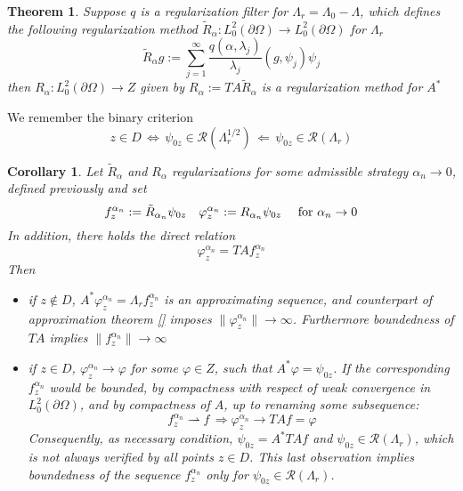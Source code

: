 \documentclass[10pt, a4paper, twoside, openright]{book}
\theoremstyle{definition}
\theoremstyle{plain}
\newtheorem{theorem}[subsection]{Theorem}
\theoremstyle{plain}
\newtheorem{corollary}[subsection]{Corollary}
\theoremstyle{plain}
\theoremstyle{plain}
\theoremstyle{plain}
\theoremstyle{plain}
\theoremstyle{plain}
\theoremstyle{plain}
\let\phi\varphi
\begin{document}
\begin{theorem}
 Suppose $q$ is a regularization filter for $\Lambda_r = \Lambda_0- \Lambda$, which defines the following regularization method $\tilde{R}_\alpha : L^2_0(\partial \Omega) \to L^2_0(\partial\Omega)$ for $\Lambda_r$
 \begin{equation}
  \tilde{R}_\alpha g := \sum_{j=1}^\infty\frac{q(\alpha,\lambda_j)}{\lambda_j}(g,\psi_j)\psi_j
 \end{equation}
 then $R_\alpha : L^2_0(\partial\Omega) \to Z$  given by $R_\alpha:=TA\tilde{R}_\alpha$ is a regularization method for $A^*$
\end{theorem}
We remember the binary criterion
\begin{equation}
 z\in D \,\Longleftrightarrow \, \psi_{0z}\in\mathcal{R}(\Lambda_r^{1/2})\, \Longleftarrow \,\psi_{0z}\in\mathcal{R}(\Lambda_r)
\end{equation}

\begin{corollary}
 Let $\tilde{R}_\alpha$ and $R_\alpha$ regularizations for some admissible strategy $\alpha_n\to 0$, defined previously and set
 \begin{equation}
  f_z^{\alpha_n}:=\tilde{R}_{\alpha_n}\psi_{0z}\quad \phi_z^{\alpha_n}:=R_{\alpha_n}\psi_{0z}\quad\textup{ for }\alpha_n \to 0
 \end{equation}
 In addition, there holds the direct relation
 \begin{equation}
  \phi_z^{\alpha_n} = TAf_z^{\alpha_n}
 \end{equation}
Then
\begin{itemize}
 \item if $z\notin D$, $A^*\phi_z^{\alpha_n} = \Lambda_rf_z^{\alpha_n}$ is an approximating sequence, and counterpart of approximation theorem \ref{} imposes $\|\phi_z^{\alpha_n}\|\to\infty$. Furthermore boundedness of $TA$ implies $\|f_z^{\alpha_n}\|\to\infty$
 \item if $z \in D$, $\phi_z^{\alpha_n}\to \phi$ for some $\phi\in Z$, such that $A^*\phi = \psi_{0z}$. If the corresponding $f_z^{\alpha_n}$ would be bounded, by compactness with respect of weak convergence in $L^2_0(\partial\Omega)$, and by compactness of $A$, up to renaming some subsequence:
 \begin{equation}
  f_z^{\alpha_n}\rightharpoonup f \,\Rightarrow \phi_z^{\alpha_n} \to TA f = \phi
 \end{equation}
Consequently, as necessary condition, $\psi_{0z}=A^*TAf$ and $\psi_{0z}\in\mathcal{R}(\Lambda_r)$, which is not always verified by all points $z\in D$.
This last observation implies boundedness of the sequence $f_z^{\alpha_n}$ only for $\psi_{0z}\in\mathcal{R}(\Lambda_r)$.
\end{itemize}
\end{corollary}
\end{document}
